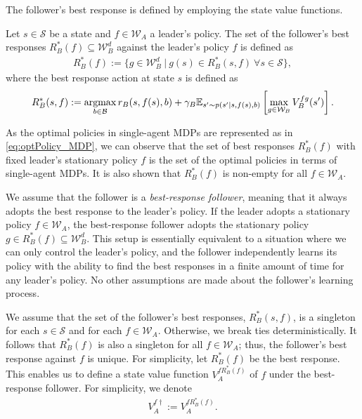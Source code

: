 \documentclass{acml}
\providecommand{\argmax}{\operatornamewithlimits{argmax}} %
\providecommand{\E}{\mathbb{E}} %
\begin{document}
The follower's best response is defined by employing the state value functions.
\begin{definition}
	Let $s\in\mathcal{S}$ be a state and $f\in\mathcal{W}_A$ a leader's policy.
	The set of the follower's best responses $R_B^*(f)\subseteq \mathcal{W}_B^d$ against the leader's policy $f$ is defined as 
	\begin{align*}
		R_B^*(f):=\{g\in \mathcal{W}_B^d~|~g(s)\in R_B^*(s,f)~\forall s\in\mathcal{S}\},
	\end{align*}
	where the best response action at state $s$ is defined as
	\begin{equation*}
		R_B^*(s,f):=\argmax_{b\in\mathcal{B}} r_B(s,f(s),b) + \gamma_B\E_{s'\sim p(s'|s,f(s),b)}\left[\max_{g\in \mathcal{W}_B}V_B^{fg}(s')\right].
	\end{equation*}
\end{definition}

As the optimal policies in single-agent MDPs are represented as in \cref{eq:optPolicy_MDP}, we can observe that the set of best responses $R_B^*(f)$ with fixed leader's stationary policy $f$ is the set of the optimal policies in terms of single-agent MDPs.
It is also shown that $R_B^*(f)$ is non-empty for all $f\in\mathcal{W}_A$.

We assume that the follower is a \emph{best-response follower}, meaning that it always adopts the best response to the leader's policy. 
If the leader adopts a stationary policy $f\in\mathcal{W}_A$, the best-response follower adopts the stationary policy $g\in R_B^*(f)\subseteq\mathcal{W}_B^d$.
This setup is essentially equivalent to a situation where we can only control the leader's policy, and the follower independently learns its policy with the ability to find the best responses in a finite amount of time for any leader's policy.
No other assumptions are made about the follower's learning process.


We assume that the set of the follower's best responses, $R_B^*(s,f)$, is a singleton for each $s\in\mathcal{S}$ and for each $f\in\mathcal{W}_A$. Otherwise, we break ties deterministically.
It follows that $R_B^*(f)$ is also a singleton for all $f\in\mathcal{W}_A$; thus, the follower's best response against $f$ is unique.
For simplicity, let $R_B^*(f)$ be the best response.
This enables us to define a state value function $V_A^{fR_B^*(f)}$ of $f$ under the best-response follower.
For simplicity, we denote
\begin{align*}
	V_A^{f\dag}:=V_A^{fR_B^*(f)}.
\end{align*}
\end{document}
